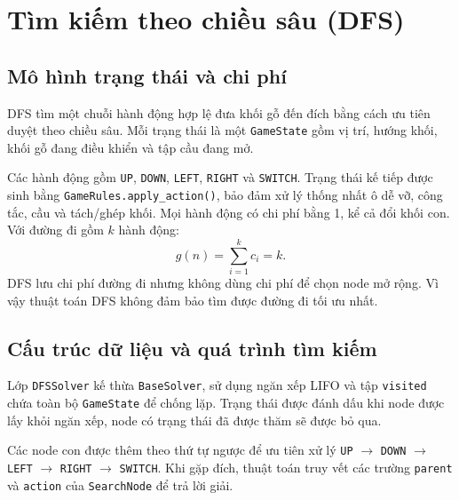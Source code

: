\section{Tìm kiếm theo chiều sâu (DFS)}

\subsection{Mô hình trạng thái và chi phí}
DFS tìm một chuỗi hành động hợp lệ đưa khối gỗ đến đích bằng cách ưu tiên duyệt theo chiều sâu. Mỗi trạng thái là một \texttt{GameState} gồm vị trí,
hướng khối, khối gỗ đang điều khiển và tập cầu đang mở.

Các hành động gồm \texttt{UP}, \texttt{DOWN}, \texttt{LEFT},
\texttt{RIGHT} và \texttt{SWITCH}. Trạng thái kế tiếp được sinh bằng
\texttt{GameRules.apply\_action()}, bảo đảm xử lý thống nhất ô dễ vỡ,
công tắc, cầu và tách/ghép khối. Mọi hành động có chi phí bằng 1,
kể cả đổi khối con. Với đường đi gồm $k$ hành động:
\[
    g(n)=\sum_{i=1}^{k}c_i=k.
\]
DFS lưu chi phí đường đi nhưng không dùng chi phí để chọn node mở rộng. Vì vậy thuật toán DFS không đảm bảo tìm được đường đi tối ưu nhất.

\subsection{Cấu trúc dữ liệu và quá trình tìm kiếm}
Lớp \texttt{DFSSolver} kế thừa \texttt{BaseSolver}, sử dụng ngăn xếp LIFO và tập \texttt{visited} chứa toàn bộ \texttt{GameState}
để chống lặp. Trạng thái được đánh dấu khi node được lấy khỏi ngăn xếp, node có trạng thái đã được thăm sẽ được bỏ qua.

Các node con được thêm theo thứ tự ngược để ưu tiên xử lý
\texttt{UP} $\rightarrow$ \texttt{DOWN} $\rightarrow$ \texttt{LEFT}
$\rightarrow$ \texttt{RIGHT} $\rightarrow$ \texttt{SWITCH}.
Khi gặp đích, thuật toán truy vết các trường \texttt{parent} và
\texttt{action} của \texttt{SearchNode} để trả lời giải.

